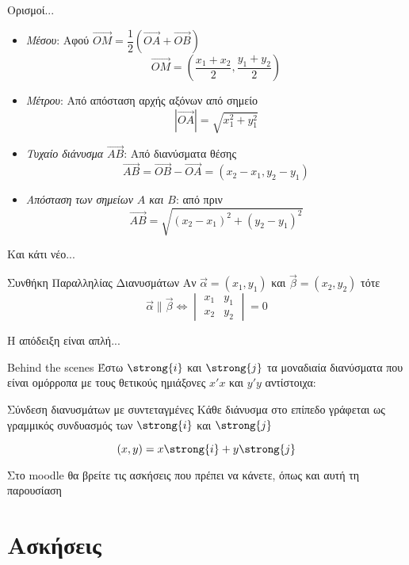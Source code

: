 \documentclass[greek]{beamer}
\begin{document}
\begin{frame}{Ορισμοί...}
  \begin{itemize}
    \item<1-> \emph{Μέσου}: Αφού $\overrightarrow{ΟΜ}=\dfrac{1}{2}\left( \overrightarrow{ΟΑ}+\overrightarrow{ΟΒ}\right)$
          $$\overrightarrow{ΟΜ}=\left(\dfrac{x_1+x_2}{2},\dfrac{y_1+y_2}{2}\right)$$
    \item<2-> \emph{Μέτρου}: Από απόσταση αρχής αξόνων από σημείο
          $$|\overrightarrow{ΟΑ}|=\sqrt{x_1^2+y_1^2}$$
    \item<3-> \emph{Τυχαίο διάνυσμα $\overrightarrow{ΑΒ}$}: Από διανύσματα θέσης
          $$\overrightarrow{ΑΒ}=\overrightarrow{ΟΒ}-\overrightarrow{ΟΑ}=(x_2-x_1,y_2-y_1)$$
    \item<4-> \emph{Aπόσταση των σημείων $Α$ και $Β$}: από πριν
          $$\overrightarrow{ΑΒ}=\sqrt{(x_2-x_1)^2+(y_2-y_1)^2}$$
  \end{itemize}
\end{frame}

\begin{frame}{Και κάτι νέο...}
  \begin{block}{Συνθήκη Παραλληλίας Διανυσμάτων}
    Αν $\vec{α}=(x_1,y_1)$ και $\vec{β}=(x_2,y_2)$ τότε
    $$\vec{α} 	\parallel \vec{β} \iff \begin{vmatrix}
        x_1 & y_1 \\
        x_2 & y_2
      \end{vmatrix}=0$$
  \end{block} \pause
  Η απόδειξη είναι απλή...
\end{frame}

\begin{frame}{Behind the scenes}
  Έστω $\strong{i}$ και $\strong{j}$ τα μοναδιαία διανύσματα που είναι ομόρροπα με τους θετικούς ημιάξονες $x'x$ και $y'y$ αντίστοιχα:
  \begin{block}{Σύνδεση διανυσμάτων με συντεταγμένες}
    Κάθε διάνυσμα στο επίπεδο γράφεται ως γραμμικός συνδυασμός των $\strong{i}$ και $\strong{j}$

    $$(x,y)=x\strong{i}+y\strong{j}$$
  \end{block}
\end{frame}

\begin{frame}
  Στο moodle θα βρείτε τις ασκήσεις που πρέπει να κάνετε, όπως και αυτή τη παρουσίαση
\end{frame}

\section{Ασκήσεις}
\end{document}
